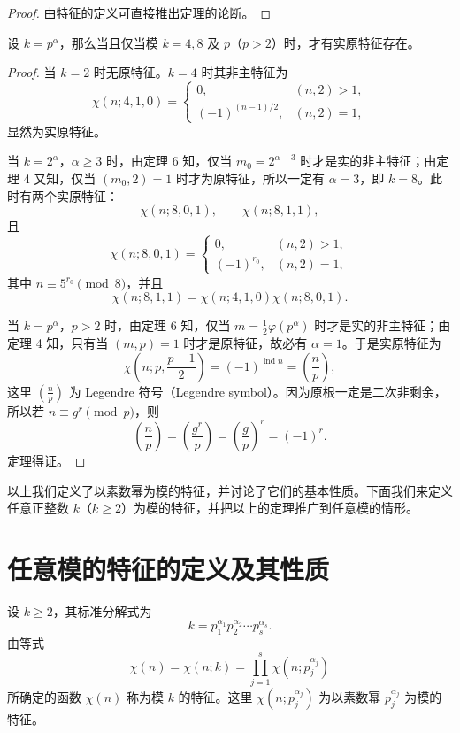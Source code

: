 \begin{proof}
	由特征的定义可直接推出定理的论断。
\end{proof}

\begin{theorem}[原文 定理 7]
	设 $k=p^\alpha$，那么当且仅当模 $k=4,8$ 及 $p$（$p>2$）时，才有实原特征存在。
\end{theorem}

\begin{proof}
	当 $k=2$ 时无原特征。$k=4$ 时其非主特征为
	\[
		\chi(n;4,1,0)=
		\begin{cases}
			0, & (n,2)>1,\\
			(-1)^{(n-1)/2}, & (n,2)=1,
		\end{cases}
	\]
	显然为实原特征。

	当 $k=2^\alpha$，$\alpha\geq3$ 时，由定理 6 知，仅当 $m_0=2^{\alpha-3}$ 时才是实的非主特征；由定理 4 又知，仅当 $(m_0,2)=1$ 时才为原特征，所以一定有 $\alpha=3$，即 $k=8$。此时有两个实原特征：
	\[
		\chi(n;8,0,1),\qquad \chi(n;8,1,1),
	\]
	且
	\[
		\chi(n;8,0,1)=
		\begin{cases}
			0, & (n,2)>1,\\
			(-1)^{r_0}, & (n,2)=1,
		\end{cases}
	\]
	其中 $n\equiv5^{r_0}\pmod 8$，并且
	\[
		\chi(n;8,1,1)=\chi(n;4,1,0)\chi(n;8,0,1).
	\]

	当 $k=p^\alpha$，$p>2$ 时，由定理 6 知，仅当 $m=\frac{1}{2}\varphi(p^\alpha)$ 时才是实的非主特征；由定理 4 知，只有当 $(m,p)=1$ 时才是原特征，故必有 $\alpha=1$。于是实原特征为
	\[
		\chi\left(n;p,\frac{p-1}{2}\right)
		=
		(-1)^{\operatorname{ind}n}
		=
		\left(\frac{n}{p}\right),
	\]
	这里 $\left(\frac{n}{p}\right)$ 为 Legendre 符号（Legendre symbol）。因为原根一定是二次非剩余，所以若 $n\equiv g^r\pmod p$，则
	\[
		\left(\frac{n}{p}\right)
		=
		\left(\frac{g^r}{p}\right)
		=
		\left(\frac{g}{p}\right)^r
		=
		(-1)^r.
	\]
	定理得证。
\end{proof}

以上我们定义了以素数幂为模的特征，并讨论了它们的基本性质。下面我们来定义任意正整数 $k$（$k\geq2$）为模的特征，并把以上的定理推广到任意模的情形。

\section{任意模的特征的定义及其性质}

\begin{definition}[原文 定义 3]
	设 $k\geq2$，其标准分解式为
	\[
		k=p_1^{\alpha_1}p_2^{\alpha_2}\cdots p_s^{\alpha_s}.
	\]
	由等式
	\begin{equation}
		\chi(n)=\chi(n;k)=\prod_{j=1}^{s}\chi(n;p_j^{\alpha_j})
		\tag{7}
	\end{equation}
	所确定的函数 $\chi(n)$ 称为模 $k$ 的特征。这里 $\chi(n;p_j^{\alpha_j})$ 为以素数幂 $p_j^{\alpha_j}$ 为模的特征。
\end{definition}


